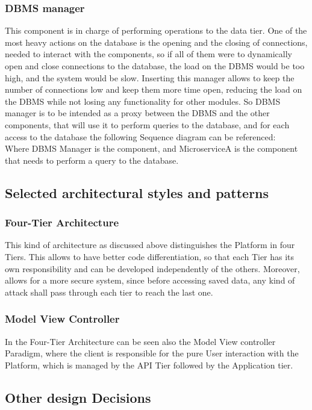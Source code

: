 \subsubsection{DBMS manager}
This component is in charge of performing operations to the data tier.
One of the most heavy actions on the database is the opening and the closing of connections, needed to interact with the components, so if all of them were to dynamically open and close connections to the database, the load on the DBMS would be too high, and the system would be slow. 
Inserting this manager allows to keep the number of connections low and keep them more time open, reducing the load on the DBMS while not losing any functionality for other modules. 
So DBMS manager is to be intended as a proxy between the DBMS and the other components, that will use it to perform queries to the database, and for each access to the database the following Sequence diagram can be referenced:\\
Where DBMS Manager is the component, and MicroserviceA is the component that needs to perform a query to the database. 


\subsection{Selected architectural styles and patterns}
\subsubsection{Four-Tier Architecture}
This kind of architecture as discussed above distinguishes the Platform in four Tiers. 
This allows to have better code differentiation, so that each Tier has its own responsibility and can be developed independently of the others. 
Moreover, allows for a more secure system, since before accessing saved data, any kind of attack shall pass through each tier to reach the last one.

\subsubsection{Model View Controller}
In the Four-Tier Architecture can be seen also the Model View controller Paradigm, where the client is responsible for the pure User interaction with the Platform, which is managed by the API Tier followed by the Application tier.

\subsection{Other design Decisions}
